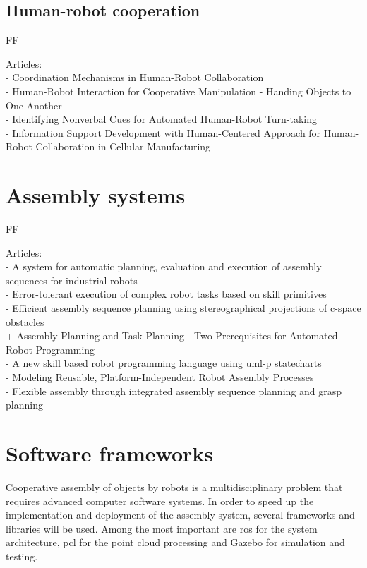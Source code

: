 \subsection{Human-robot cooperation}

FF

Articles:\\
- Coordination Mechanisms in Human-Robot Collaboration\\
- Human-Robot Interaction for Cooperative Manipulation - Handing Objects to One Another\\
- Identifying Nonverbal Cues for Automated Human-Robot Turn-taking\\
- Information Support Development with Human-Centered Approach for Human-Robot Collaboration in Cellular Manufacturing

\section{Assembly systems}

FF

Articles:\\
- A system for automatic planning, evaluation and execution of assembly sequences for industrial robots\\
- Error-tolerant execution of complex robot tasks based on skill primitives\\
- Efficient assembly sequence planning using stereographical projections of c-space obstacles\\
+ Assembly Planning and Task Planning - Two Prerequisites for Automated Robot Programming\\
- A new skill based robot programming language using uml-p statecharts\\
- Modeling Reusable, Platform-Independent Robot Assembly Processes\\
- Flexible assembly through integrated assembly sequence planning and grasp planning



\section{Software frameworks}

Cooperative assembly of objects by robots is a multidisciplinary problem that requires advanced computer software systems. In order to speed up the implementation and deployment of the assembly system, several frameworks and libraries will be used. Among the most important are \gls{ros} for the system architecture, \gls{pcl} for the point cloud processing and Gazebo for simulation and testing.

